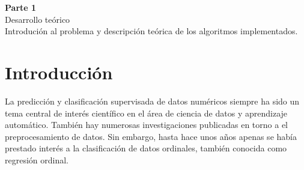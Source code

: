 
\newpage
\hspace{190pt}
\begin{center}
	\Huge\textbf{Parte 1} \\
	\vspace{50pt} 
	\Huge \textcolor{SchoolColor}{Desarrollo teórico} \\
	\vspace{50pt}
	\Large Introdución al problema y descripción teórica de los algoritmos implementados.
\end{center}

\chapter{Introducción}
\label{introduction}

La predicción y clasificación supervisada de datos numéricos siempre ha sido un tema central de interés científico en el área de ciencia de datos y aprendizaje automático. También hay numerosas investigaciones publicadas en torno a el preprocesamiento de datos. Sin embargo, hasta hace unos años apenas se había prestado interés a la clasificación de datos ordinales, también conocida como regresión ordinal.

